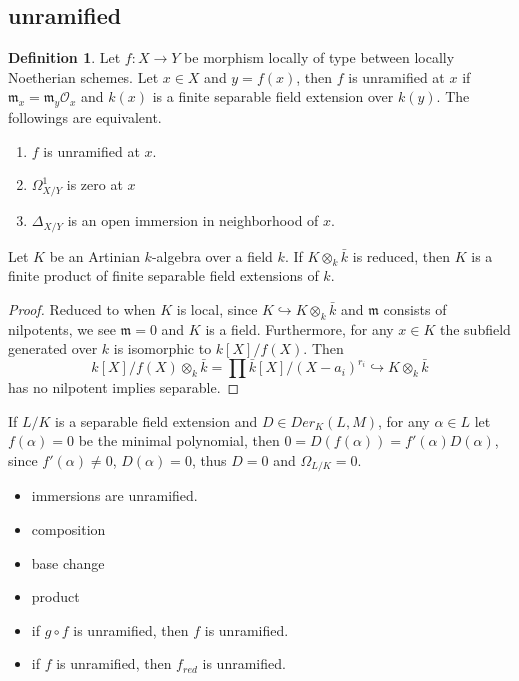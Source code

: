 \documentclass[leqno]{amsart}
\newcommand{\oo}{\mathcal O}
\newcommand{\1}{\mathbf{1}}
\newcommand{\fm}{\mathfrak m}
\theoremstyle{definition}
\newtheorem{defn}[thm]{Definition}
\theoremstyle{remark}
\begin{document}
\subsection{unramified}

\begin{defn}
	Let  $f\colon X\to Y$ be morphism locally of type
	between locally Noetherian schemes.
	Let $x\in X$ and $y=f(x)$,
	then  $f$ is unramified at $x$
	if $\fm_x=\fm_y\oo_x$ and $k(x)$ is a 
	finite separable field extension over $k(y)$.
	The followings are equivalent.
	\begin{enumerate}[label=(\alph*)]
		\item $f$ is unramified at  $x$.
		\item  $\Omega^1_{X/Y}$ is zero at $x$
		\item  $\Delta_{X/Y}$ is an open
			immersion in neighborhood of $x$.
	\end{enumerate}
\end{defn}


Let $K $ be an Artinian $k$-algebra
over a field $k$.
If $K\otimes_k\bar{k}$ is reduced, 
then   $K$ is a finite product of finite separable
field  extensions of $k$.
\begin{proof}
	Reduced to when $K$ is local,
	since  $K\hookrightarrow K\otimes_k\bar{k}$ 
	and $\fm$ consists of nilpotents,
	we see  $\fm=0$ and  $K$ is a field.
	Furthermore, for any  $x\in K$
	the subfield generated over  $k$
	is isomorphic to  $k[X]/f(X)$.
	Then 
	 \[
		 k[X]/f(X)\otimes_k\bar{k}
		 =\prod\bar{k}[X]/(X-a_i)^{r_i}\hookrightarrow
		 K\otimes_k\bar{k}
	\]
	has no nilpotent implies separable.
\end{proof}
If $L/K$ is a separable field extension
and  $D\in Der_K(L,M)$,
for any  $\alpha\in L$
let  $f(\alpha)=0$ be the minimal polynomial,
then  $0=D(f(\alpha))=f'(\alpha)D(\alpha)$,
since  $f'(\alpha)\neq 0$,  $D(\alpha)=0$,
thus  $D=0$ and  $\Omega_{L/K}=0$.

\begin{itemize}
	\item immersions are unramified.
	\item composition
	\item base change
	\item product 
	\item if $g\circ f$ is unramified, then
		 $f$ is unramified.
	\item if  $f$ is unramified, 
		 then  $f_{red}$ is unramified.
\end{itemize}
\end{document}
